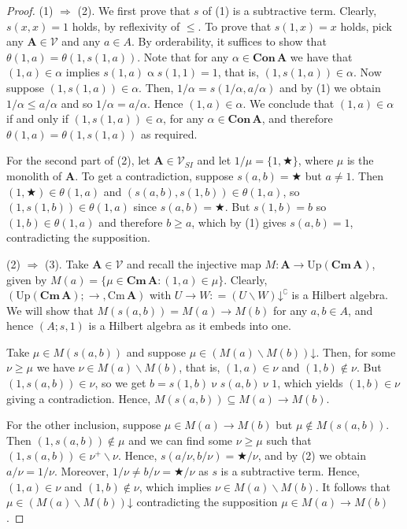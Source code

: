 \documentclass{amsart}
\newcommand{\deq}{\mathrel{\mathop:}=}
\newcommand{\alg}[1]{\mathbf{#1}}
\newcommand{\Con}[1]{\mathbf{Con}\, #1}
\newcommand{\Cm}[1]{\mathbf{Cm}\, #1}
\newcommand{\cm}[1]{\mathrm{Cm}\, #1}
\def\Ra{\Rightarrow}
\def\ra{\rightarrow}
\def\dw#1{{#1}\mathord{\downarrow}}
\def\op{\bigstar}
\begin{document}
\begin{proof}
(1) $\Ra$ (2). We first prove that $s$ of (1) is a subtractive
term. Clearly, $s(x,x) = 1$ holds, by reflexivity of $\leq$. To prove that
$s(1,x) = x$ holds, pick any $\alg{A}\in\mathcal{V}$ and any $a\in A$.
By orderability, it suffices to show that $\theta(1,a) = \theta(1, s(1,a))$.
Note that for any $\alpha\in\Con{\alg{A}}$ we have that
$(1,a)\in\alpha$ implies $s(1,a)\mathbin{\alpha} s(1,1) = 1$, that is,
$(1, s(1,a))\in\alpha$. Now suppose $(1, s(1,a))\in\alpha$. Then,
$1/\alpha = s(1/\alpha,a/\alpha)$ and by (1) we obtain $1/\alpha\leq a/\alpha$
and so $1/\alpha = a/\alpha$. Hence $(1,a)\in\alpha$. We conclude that
$(1,a)\in\alpha$ if and only if $(1, s(1,a))\in\alpha$, for any
$\alpha\in\Con{\alg{A}}$, and therefore
$\theta(1,a) = \theta(1, s(1,a))$ as required.

For the second part of (2), let $\alg{A}\in\mathcal{V}_{SI}$ and let
$1/\mu = \{1,\op\}$, where $\mu$ is the monolith of $\alg{A}$.
To get a contradiction, suppose $s(a,b) = \op$ but $a\neq 1$. 
Then $(1,\op)\in \theta(1,a)$ and $(s(a,b), s(1,b))\in\theta(1,a)$,
so $(1, s(1,b))\in\theta(1,a)$ since $s(a,b) = \op$. But
$s(1,b) = b$ so $(1,b)\in\theta(1,a)$ and therefore $b\geq a$, which by (1)
gives $s(a,b) = 1$, contradicting the supposition.

(2) $\Ra$ (3). Take $\alg{A}\in\mathcal{V}$ and recall the
injective map $M\colon \alg{A}\to\mathrm{Up}(\Cm{\alg{A}})$,
given by $M(a) = \{\mu\in\Cm{\alg{A}}: (1,a)\in\mu\}$. Clearly,
$(\mathrm{Up}(\Cm{\alg{A}}); \ra, \cm{\alg{A}})$ 
with $U\ra W\deq \dw{(U\smallsetminus W)}^\complement$ is a Hilbert algebra.
We will show that $M(s(a,b)) = M(a)\ra M(b)$ for any $a,b\in A$, and hence
$(A; s, 1)$ is a Hilbert algebra as it embeds into one. 

Take $\mu\in M(s(a,b))$ and suppose $\mu\in \dw{(M(a)\smallsetminus M(b))}$.
Then, for some $\nu\geq\mu$ we have $\nu\in M(a)\smallsetminus M(b)$, that is,
$(1,a)\in \nu$ and $(1,b)\notin\nu$. But $(1, s(a,b))\in\nu$, so
we get $b = s(1,b) \mathbin{\nu} s(a,b) \mathbin{\nu} 1$, which yields
$(1,b)\in\nu$ giving a contradiction. Hence, $M(s(a,b))\subseteq M(a)\ra M(b)$.

For the other inclusion, suppose $\mu\in M(a)\ra M(b)$ but
$\mu\notin M(s(a,b))$. Then $(1,s(a,b))\notin\mu$ and we can find some $\nu\geq\mu$
such that $(1,s(a,b))\in\nu^+\smallsetminus\nu$. Hence, $s(a/\nu,b/\nu) = \op/\nu$, and by
(2) we obtain $a/\nu = 1/\nu$.  Moreover, $1/\nu \neq b/\nu = \op/\nu$ as $s$ is a
subtractive term. Hence, $(1,a)\in\nu$ and $(1,b)\notin\nu$, which implies
$\nu\in M(a)\smallsetminus M(b)$. It follows that
$\mu\in\dw{(M(a)\smallsetminus M(b))}$
contradicting the supposition $\mu\in M(a)\ra M(b)$.


\end{proof}
\end{document}
